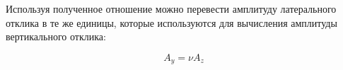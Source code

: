 Используя полученное отношение можно перевести амплитуду латерального отклика в те же единицы, которые используются для вычисления амплитуды вертикального отклика:

\[A_y = \nu A_z\]
\todo{



}